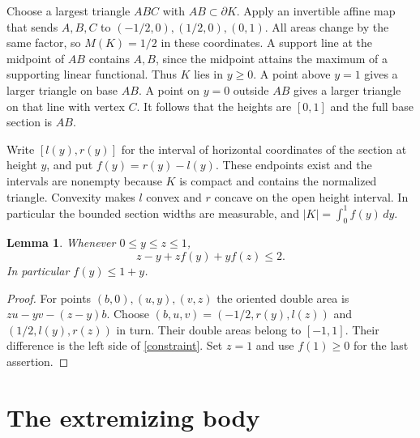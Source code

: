 \documentclass[11pt]{article}
\newtheorem{lemma}[theorem]{Lemma}
\newcommand{\area}[1]{\lvert #1\rvert}
\begin{document}
Choose a largest triangle $ABC$ with $AB\subset\partial K$. Apply an
invertible affine map that sends $A,B,C$ to $(-1/2,0),(1/2,0),(0,1)$.
All areas change by the same factor, so $M(K)=1/2$ in these coordinates.
A support line at the midpoint of $AB$ contains $A,B$, since the
midpoint attains the maximum of a supporting linear functional. Thus
$K$ lies in $y\ge0$. A point above $y=1$ gives a larger triangle on
base $AB$. A point on $y=0$ outside $AB$ gives a larger triangle on
that line with vertex $C$. It follows that the heights are $[0,1]$ and
the full base section is $AB$.

Write $[l(y),r(y)]$ for the interval of horizontal coordinates of the
section at height $y$, and put $f(y)=r(y)-l(y)$. These endpoints
exist and the intervals are nonempty because $K$ is compact and contains
the normalized triangle. Convexity makes $l$ convex and $r$ concave on
the open height interval. In particular the bounded section widths are
measurable, and $\area K=\int_0^1 f(y)\,dy$.

\begin{lemma}\label{widthbound}
Whenever $0\le y\le z\le1$,
\begin{equation}\label{constraint}
 z-y+zf(y)+yf(z)\le2 .
\end{equation}
In particular $f(y)\le1+y$.
\end{lemma}
\begin{proof}
For points $(b,0),(u,y),(v,z)$ the oriented double area is
$zu-yv-(z-y)b$. Choose $(b,u,v)=(-1/2,r(y),l(z))$ and
$(1/2,l(y),r(z))$ in turn. Their double areas belong to $[-1,1]$.
Their difference is the left side of \eqref{constraint}.
Set $z=1$ and use $f(1)\ge0$ for the last assertion.
\end{proof}

\section{The extremizing body}\label{attainment}
\end{document}
